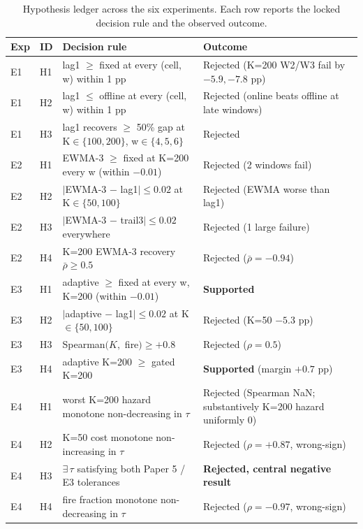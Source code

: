 \begin{table}[!t]
  \caption{Hypothesis ledger across the six experiments. Each
  row reports the locked decision rule and the observed outcome.}
  \label{tab:hypothesis_ledger}
  \centering
  \small
  \setlength{\tabcolsep}{4pt}
  \setlength{\tabcolsep}{4pt}
  \begin{tabular}{@{}llp{7.2cm}p{4.2cm}@{}}
    \toprule
    \textbf{Exp} & \textbf{ID} & \textbf{Decision rule} & \textbf{Outcome} \\
    \midrule
    E1 & H1 & lag1 $\geq$ fixed at every (cell, w) within 1 pp & Rejected (K=200 W2/W3 fail by $-5.9, -7.8$ pp) \\
    E1 & H2 & lag1 $\leq$ offline at every (cell, w) within 1 pp & Rejected (online beats offline at late windows) \\
    E1 & H3 & lag1 recovers $\geq$ 50\% gap at K$\in\{100,200\}$, w$\in\{4,5,6\}$ & Rejected \\
    \midrule
    E2 & H1 & EWMA-3 $\geq$ fixed at K=200 every w (within $-0.01$) & Rejected (2 windows fail) \\
    E2 & H2 & $|$EWMA-3 $-$ lag1$|\leq 0.02$ at K$\in\{50,100\}$ & Rejected (EWMA worse than lag1) \\
    E2 & H3 & $|$EWMA-3 $-$ trail3$|\leq 0.02$ everywhere & Rejected (1 large failure) \\
    E2 & H4 & K=200 EWMA-3 recovery $\bar\rho \geq 0.5$ & Rejected ($\bar\rho = -0.94$) \\
    \midrule
    E3 & H1 & adaptive $\geq$ fixed at every w, K=200 (within $-0.01$) & \textbf{Supported} \\
    E3 & H2 & $|$adaptive $-$ lag1$|\leq 0.02$ at K$\in\{50,100\}$ & Rejected (K=50 $-5.3$ pp) \\
    E3 & H3 & Spearman$(K, $ fire$) \geq +0.8$ & Rejected ($\rho = 0.5$) \\
    E3 & H4 & adaptive K=200 $\geq$ gated K=200 & \textbf{Supported} (margin $+0.7$ pp) \\
    \midrule
    E4 & H1 & worst K=200 hazard monotone non-decreasing in $\tau$ & Rejected (Spearman NaN; substantively K=200 hazard uniformly 0) \\
    E4 & H2 & K=50 cost monotone non-increasing in $\tau$ & Rejected ($\rho = +0.87$, wrong-sign) \\
    E4 & H3 & $\exists\,\tau$ satisfying both Paper 5 / E3 tolerances & \textbf{Rejected, central negative result} \\
    E4 & H4 & fire fraction monotone non-decreasing in $\tau$ & Rejected ($\rho = -0.97$, wrong-sign) \\

\end{tabular}
\end{table}
